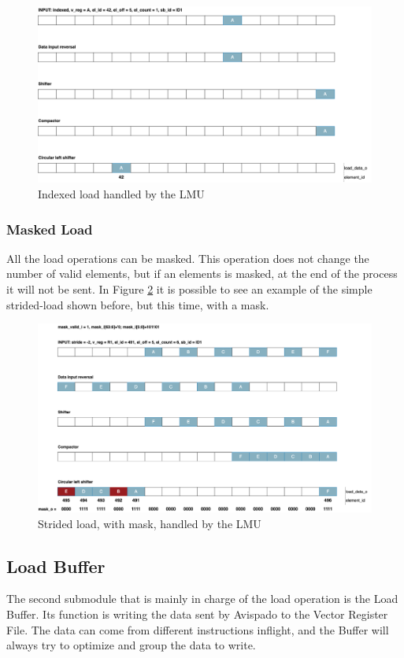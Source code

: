 \begin{figure}[H]
    \centering
    \includegraphics[scale = 0.25]{Chapter_2/img/lmu-indexed.png}
    \caption{Indexed load handled by the LMU}
    \label{lmu-indexed}
\end{figure}

\subsubsection{Masked Load}
All the load operations can be masked. This operation does not change the number of valid elements, but if an elements is masked, at the end of the process it will not be sent.
In Figure \ref{lmu-masked-stride} it is possible to see an example of the simple strided-load shown before, but this time, with a mask.

\begin{figure}[H]
    \centering
    \includegraphics[scale = 0.25]{Chapter_2/img/lmu-masked-strided.png}
    \caption{Strided load, with mask, handled by the LMU}
    \label{lmu-masked-stride}
\end{figure}

\subsection{Load Buffer}
The second submodule that is mainly in charge of the load operation is the Load Buffer.
Its function is writing the data sent by Avispado to the Vector Register File. The data can come from different instructions inflight, and the Buffer will always try to optimize and group the data to write.

